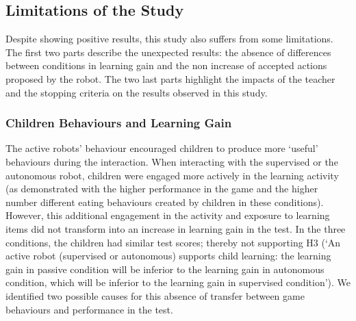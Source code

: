 \subsection{Limitations of the Study}

Despite showing positive results, this study also suffers from some limitations. The first two parts describe the unexpected results: the absence of differences between conditions in learning gain and the non increase of accepted actions proposed by the robot. The two last parts highlight the impacts of the teacher and the stopping criteria on the results observed in this study.

\subsubsection{Children Behaviours and Learning Gain}

%
%
%

The active robots' behaviour encouraged children to produce more `useful' behaviours during the interaction. When interacting with the supervised or the autonomous robot, children were engaged more actively in the learning activity (as demonstrated with the higher performance in the game and the higher number different eating behaviours created by children in these conditions). However, this additional engagement in the activity and exposure to learning items did not transform into an increase in learning gain in the test. In the three conditions, the children had similar test scores; thereby not supporting H3 (`An active robot (supervised or autonomous) supports child learning: the learning gain in passive condition will be inferior to the learning gain in autonomous condition, which will be inferior to the learning gain in supervised condition'). We identified two possible causes for this absence of transfer between game behaviours and performance in the test. 

